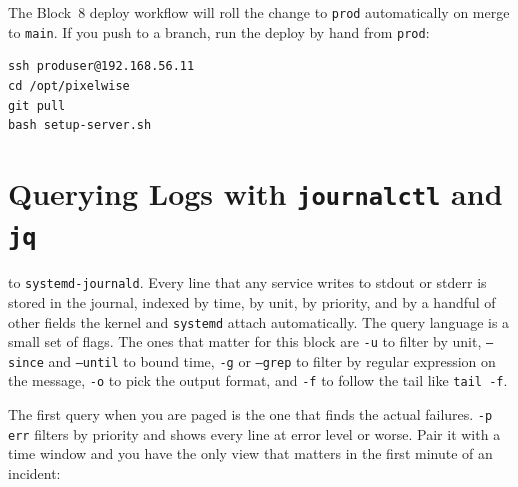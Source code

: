 The Block~8 deploy workflow will roll the change to \texttt{prod}
automatically on merge to \texttt{main}. If you push to a branch, run
the deploy by hand from \texttt{prod}:

\begin{verbatim}
ssh produser@192.168.56.11
cd /opt/pixelwise
git pull
bash setup-server.sh
\end{verbatim}




\newpage
\section{Querying Logs with \texttt{journalctl} and \texttt{jq}}

to \texttt{systemd-journald}. Every line that any service writes to
stdout or stderr is stored in the journal, indexed by time, by unit, by
priority, and by a handful of other fields the kernel and \texttt{systemd}
attach automatically. The query language is a small set of flags. The
ones that matter for this block are \texttt{-u} to filter by unit,
\texttt{--since} and \texttt{--until} to bound time, \texttt{-g} or
\texttt{--grep} to filter by regular expression on the message,
\texttt{-o} to pick the output format, and \texttt{-f} to follow the
tail like \texttt{tail -f}.


The first query when you are paged is the one that finds the actual
failures. \texttt{-p err} filters by priority and shows every line at
error level or worse. Pair it with a time window and you have the only
view that matters in the first minute of an incident:

